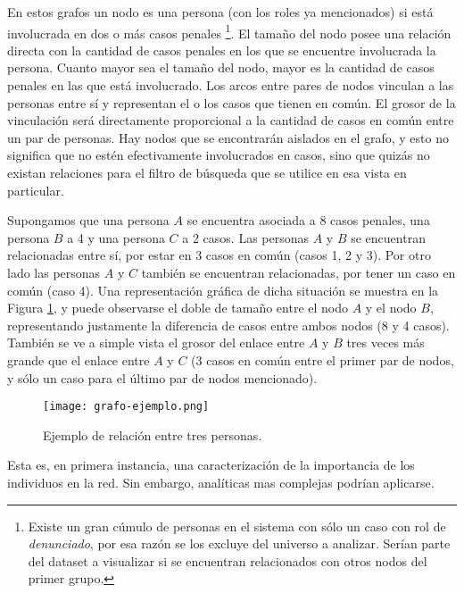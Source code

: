 En estos grafos un nodo es una persona (con los roles ya mencionados) si está involucrada en dos o más casos penales \footnote{Existe un gran cúmulo de personas en el sistema con sólo un caso con rol de \textit{denunciado}, por esa razón se los excluye del universo a analizar. Serían parte del dataset a visualizar si se encuentran relacionados con otros nodos del primer grupo.}. El tamaño del nodo posee una relación directa con la cantidad de casos penales en los que se encuentre involucrada la persona. Cuanto mayor sea el tamaño del nodo, mayor es la cantidad de casos penales en las que está involucrado.
Los arcos entre pares de nodos vinculan a las personas entre sí y representan el o los casos que tienen en común. El grosor de la vinculación será directamente proporcional a la cantidad de casos en común entre un par de personas. Hay nodos que se encontrarán aislados en el grafo, y esto no significa que no estén efectivamente involucrados en casos, sino que quizás no existan relaciones para el filtro de búsqueda que se utilice en esa vista en particular.

Supongamos que una persona $A$ se encuentra asociada a 8 casos penales, una persona $B$ a 4 y una persona $C$ a 2 casos. 
Las personas $A$ y $B$ se encuentran relacionadas entre sí, por estar en 3 casos en común (casos 1, 2 y 3). Por otro lado las personas $A$ y $C$ también se encuentran relacionadas, por tener un caso en común (caso 4).  Una representación gráfica de dicha situación se muestra en la Figura \ref{fig:grafode2}, y puede observarse el doble de tamaño entre el nodo $A$ y el nodo $B$, representando justamente la diferencia de casos entre ambos nodos (8 y 4 casos). También se ve a simple vista el grosor del enlace entre $A$ y $B$ tres veces más grande que el enlace entre $A$ y $C$ (3 casos en común entre el primer par de nodos, y sólo un caso para el último par de nodos mencionado). 


\begin{figure}
	\centering
	\texttt{[image: grafo-ejemplo.png]}
	\caption{Ejemplo de relación entre tres personas.} 
	\label{fig:grafode2}
\end{figure}

Esta es, en primera instancia, una caracterización de la importancia de los individuos en la red.
Sin embargo, analíticas mas complejas podrían aplicarse.